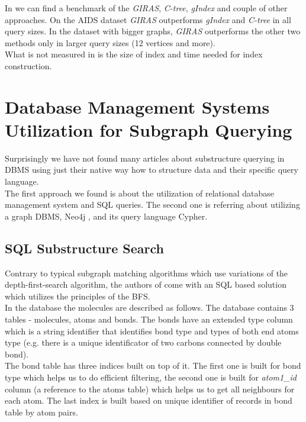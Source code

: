 In \cite{GIRAS} we can find a benchmark of the \textit{GIRAS}, \textit{C-tree}, \textit{gIndex} and couple of other approaches. On the AIDS dataset \textit{GIRAS} outperforms \textit{gIndex} and \textit{C-tree} in all query sizes. In the dataset with bigger graphs, \textit{GIRAS} outperforms the other two methods only in larger query sizes (12 vertices and more).\\

What is not measured in \cite{GIRAS} is the size of index and time needed for index construction.

\section{Database Management Systems Utilization for Subgraph Querying}

Surprisingly we have not found many articles about substructure querying in DBMS using just their native way how to structure data and their specific query language.\\

The first approach \cite{SQL} we found is about the utilization of relational database management system and SQL queries. The second one \cite{Hoksza} is referring about utilizing a graph DBMS, Neo4j \cite{Neo4J}, and its query language Cypher.

\subsection{SQL Substructure Search}

Contrary to typical subgraph matching algorithms which use variations of the depth-first-search algorithm, the authors of \cite{SQL} come with an SQL based solution which utilizes the principles of the BFS.\\

In the database the molecules are described as follows. The database contains 3 tables - molecules, atoms and bonds. The bonds have an extended type column which is a string identifier that identifies bond type and types of both end atoms type (e.g. there is a unique identificator of two carbons connected by double bond).\\

The bond table has three indices built on top of it. The first one is built for bond type which helps us to do efficient filtering, the second one is built for \textit{atom1\_id} column (a reference to the atoms table) which helps us to get all neighbours for each atom. The last index is built based on unique identifier of records in bond table by atom pairs.\\


